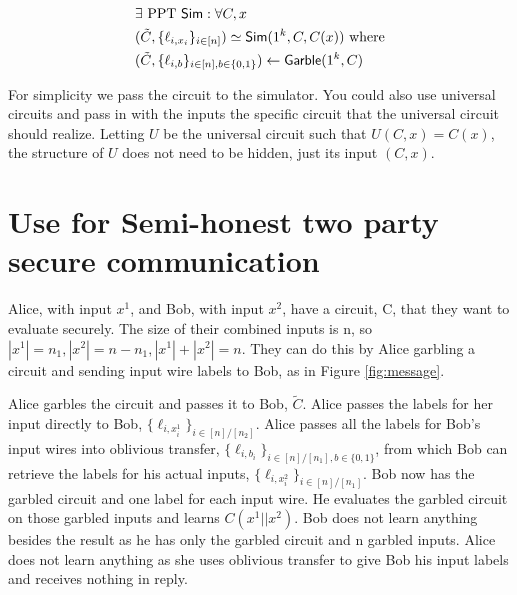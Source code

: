 \begin{align*}
&\exists\ \text{PPT}\ \mathsf{Sim} : \forall C, x\\
&(\tilde{C}, \{\ell_{i,x_i}\}_{i \in [n]}) \simeq \mathsf{Sim}(1^k, C, C(x)) \text{ where} \\
&(\tilde{C}, \{\ell_{i,b}\}_{i \in [n], b \in \{0,1\}}) \leftarrow \mathsf{Garble}(1^k, C) 
\end{align*}

For simplicity we pass the circuit to the simulator.
You could also use universal circuits and pass 
in with the inputs the specific circuit that the universal circuit should realize. Letting $U$ be the universal circuit such that $U(C, x) = C(x)$, the structure of $U$ does not need to be hidden, just its input $(C, x)$.



\section{Use for Semi-honest two party secure communication}
Alice, with input $x^1$, and Bob, with input $x^2$, have a circuit, C, that they want to evaluate securely. 
The size of their combined inputs is n, so $|x^1| = n_1, |x^2| = n - n_1, |x^1| + |x^2| = n$.
They can do this by Alice garbling a circuit and sending input wire labels to Bob, as in Figure \ref{fig:message}.

Alice garbles the circuit and passes it to Bob, $\tilde{C}$.
Alice passes the labels for her input directly to Bob, $\{\ell_{i, x^1_i}\}_{i \in [n] / [n_2]}$.
Alice passes all the labels for Bob's input wires into oblivious transfer, $\{\ell_{i, b_i}\}_{i \in [n] / [n_1], b \in \{0,1\}}$, 
from which Bob can retrieve the labels for his actual inputs, $\{\ell_{i, x^2_i}\}_{i \in [n] / [n_1]}$.
Bob now has the garbled circuit and one label for each input wire. 
He evaluates the garbled circuit on those garbled inputs and learns $C(x^1||x^2)$.
Bob does not learn anything besides the result as he has only the garbled circuit and n garbled inputs.
Alice does not learn anything as she uses oblivious transfer to give Bob his input labels and receives nothing in reply.

